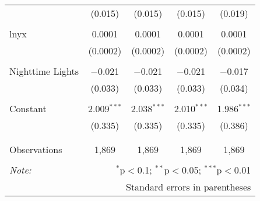 \begin{table}[!htbp]
\begin{tabular}{@{\extracolsep{5pt}}lcccc}
  & (0.015) & (0.015) & (0.015) & (0.019) \\ 
  & & & & \\ 
 lnyx & 0.0001 & 0.0001 & 0.0001 & 0.0001 \\ 
  & (0.0002) & (0.0002) & (0.0002) & (0.0002) \\ 
  & & & & \\ 
 Nighttime Lights & $-$0.021 & $-$0.021 & $-$0.021 & $-$0.017 \\ 
  & (0.033) & (0.033) & (0.033) & (0.034) \\ 
  & & & & \\ 
 Constant & 2.009$^{***}$ & 2.038$^{***}$ & 2.010$^{***}$ & 1.986$^{***}$ \\ 
  & (0.335) & (0.335) & (0.335) & (0.386) \\ 
  & & & & \\ 
\hline \\[-1.8ex] 
Observations & 1,869 & 1,869 & 1,869 & 1,869 \\ 
\hline 
\hline \\[-1.8ex] 
\textit{Note:}  & \multicolumn{4}{r}{$^{*}$p$<$0.1; $^{**}$p$<$0.05; $^{***}$p$<$0.01} \\ 
 & \multicolumn{4}{r}{Standard errors in parentheses} \\ 
\end{tabular} 
\end{table} 
